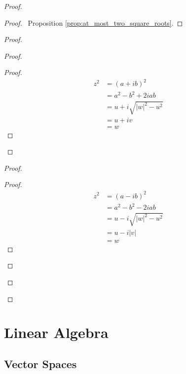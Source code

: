 \documentclass{book}
\let\qed\relax
\theoremstyle{definition}
\begin{document}
\begin{proof}
\pf
{}
\begin{proof}
	\pf\ Proposition \ref{prop:at_most_two_square_roots}.
\end{proof}
\begin{proof}
	\begin{proof}
		\begin{proof}
			\pf
			\begin{align*}
				z^2 & = (a + ib)^2 \\
				& = a^2 - b^2 + 2iab \\
				& = u + i \sqrt{|w|^2-u^2} \\
				& = u + iv \\
				& = w
			\end{align*}
		\end{proof}
	\end{proof}
	\begin{proof}
		\begin{proof}
			\pf
			\begin{align*}
				z^2 & = (a-ib)^2 \\
				& = a^2 - b^2 -2iab \\
				& = u - i \sqrt{|w|^2 - u^2} \\
				& = u - i |v| \\
				& = w
			\end{align*}
		\end{proof}
	\end{proof}
\end{proof}
\qed
\end{proof}


\part{Linear Algebra}

\newcommand{\tr}[1]{\ensuremath{\operatorname{tr}}}

\chapter{Vector Spaces}
\end{document}
